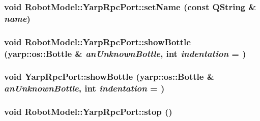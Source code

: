\label{class_robot_model_1_1_yarp_rpc_port_aa30cabbf5681b128766ad8556c33cd65}
\hypertarget{class_robot_model_1_1_yarp_rpc_port_aa30cabbf5681b128766ad8556c33cd65}{
\subsubsection[{setName}]{\setlength{\rightskip}{0pt plus 5cm}void RobotModel::YarpRpcPort::setName (const QString \& {\em name})}}
\label{class_robot_model_1_1_yarp_rpc_port_aa30cabbf5681b128766ad8556c33cd65}
\hypertarget{class_robot_model_1_1_yarp_rpc_port_abb0330c695bd22838cee0d2578b66d2d}{
\subsubsection[{showBottle}]{\setlength{\rightskip}{0pt plus 5cm}void RobotModel::YarpRpcPort::showBottle (yarp::os::Bottle \& {\em anUnknownBottle}, \/  int {\em indentation} = {})}}
\label{class_robot_model_1_1_yarp_rpc_port_abb0330c695bd22838cee0d2578b66d2d}
\hypertarget{class_robot_model_1_1_yarp_rpc_port_ae26626cb99ca15bfec5e5162845018c2}{
\subsubsection[{showBottle}]{\setlength{\rightskip}{0pt plus 5cm}void YarpRpcPort::showBottle (yarp::os::Bottle \& {\em anUnknownBottle}, \/  int {\em indentation} = {})}}
\label{class_robot_model_1_1_yarp_rpc_port_ae26626cb99ca15bfec5e5162845018c2}
\hypertarget{class_robot_model_1_1_yarp_rpc_port_a7c02179416d26e3e741a385cc1320278}{
\subsubsection[{stop}]{\setlength{\rightskip}{0pt plus 5cm}void RobotModel::YarpRpcPort::stop ()}}
